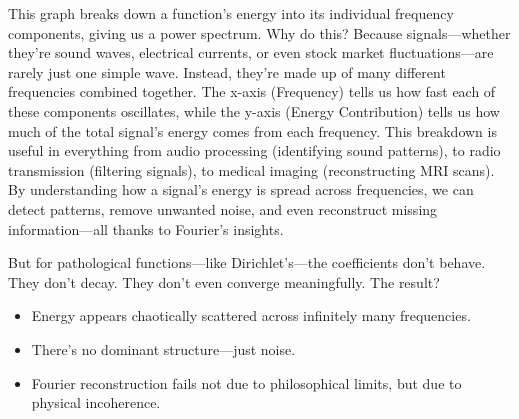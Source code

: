 This graph breaks down a function’s energy into its individual frequency components, giving us a power spectrum. Why do this? Because signals—whether they’re sound waves, electrical currents, or even stock market fluctuations—are rarely just one simple wave. Instead, they’re made up of many different frequencies combined together. The x-axis (Frequency) tells us how fast each of these components oscillates, while the y-axis (Energy Contribution) tells us how much of the total signal's energy comes from each frequency. This breakdown is useful in everything from audio processing (identifying sound patterns), to radio transmission (filtering signals), to medical imaging (reconstructing MRI scans). By understanding how a signal’s energy is spread across frequencies, we can detect patterns, remove unwanted noise, and even reconstruct missing information—all thanks to Fourier’s insights.

But for pathological functions—like Dirichlet’s—the coefficients don’t behave. They don’t decay. They don't even converge meaningfully. The result?

\begin{itemize}
    \item Energy appears chaotically scattered across infinitely many frequencies.
    \item There’s no dominant structure—just noise.
    \item Fourier reconstruction fails not due to philosophical limits, but due to physical incoherence.
\end{itemize}

